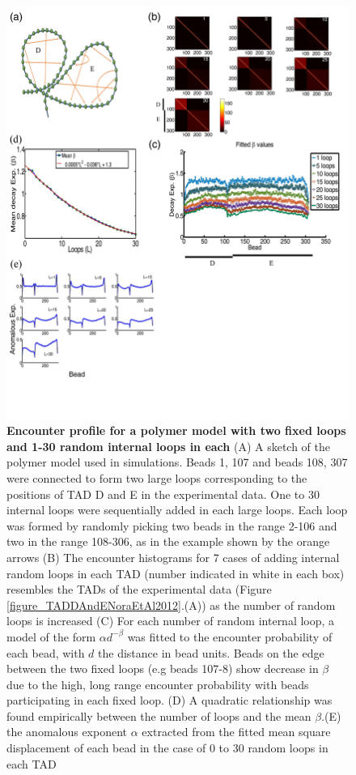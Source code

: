 \documentclass[12pt]{article}
\begin{document}
\begin{figure}[H]
\includegraphics[scale=0.5]{Figure04_TwoTADs0To30RandomLoops307Beads}
\caption{\textbf{Encounter profile for a polymer model with two fixed loops and 1-30 random internal loops in each} (A) A sketch of the polymer model used in simulations. Beads 1, 107 and beads 108, 307 were connected to form two large loops corresponding to the positions of TAD D and E in the experimental data. One to 30 internal loops were sequentially added in each large loops. Each loop was formed by randomly picking two beads in the range 2-106 and two in the range 108-306, as in the example shown by the orange arrows (B) The encounter histograms for 7 cases of adding internal random loops in each TAD (number indicated in white in each box) resembles the TADs of the experimental data (Figure \ref{figure_TADDAndENoraEtAl2012}.(A)) as the number of random loops is increased (C) For each number of random internal loop, a model of the form $\alpha d^{-\beta}$ was fitted to the encounter probability of each bead, with $d$ the distance in bead units. Beads on the edge between the two fixed loops (e.g beads 107-8) show decrease in $\beta$ due to the high, long range encounter probability with beads participating in each fixed loop. (D) A quadratic relationship was found empirically between the number of loops and the mean $\beta$.(E) the anomalous exponent $\alpha$ extracted from the fitted mean square displacement of each bead in the case of 0 to 30 random loops in each TAD}
\label{figure_encounterProfileTwoTADs}
\end{figure}
\end{document}
